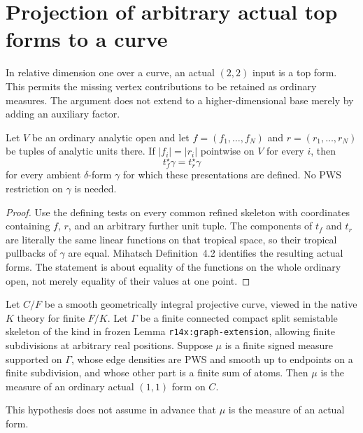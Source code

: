 \section{Projection of arbitrary actual top forms to a curve}
\label{r15tc:section}

In relative dimension one over a curve, an actual $(2,2)$ input
is a top form.  This permits the missing vertex contributions to
be retained as ordinary measures.  The argument does not extend
to a higher-dimensional base merely by adding an auxiliary factor.

\begin{lemma}
\label{r15tc:norm-tuples}
Let $V$ be an ordinary analytic open and let $f=(f_1,\ldots,f_N)$
and $r=(r_1,\ldots,r_N)$ be tuples of analytic units there.
If $|f_i|=|r_i|$ pointwise on $V$ for every $i$, then
\[
                 t_f^\star\gamma=t_r^\star\gamma
\tag{TC15.1}\label{r15tc:equal-norm}
\]
for every ambient $\delta$-form $\gamma$ for which these
presentations are defined.  No PWS restriction on $\gamma$
is needed.
\end{lemma}

\begin{proof}
Use the defining tests on every common refined skeleton with
coordinates containing $f$, $r$, and an arbitrary further unit
tuple.  The components of $t_f$ and $t_r$ are literally the same
linear functions on that tropical space, so their tropical
pullbacks of $\gamma$ are equal.  Mihatsch Definition~4.2
identifies the resulting actual forms.  The statement is about
equality of the functions on the whole ordinary open, not merely
equality of their values at one point.
\end{proof}

\begin{lemma}
\label{r15tc:graph-measure}
Let $C/F$ be a smooth geometrically integral projective curve,
viewed in the native $K$ theory for finite $F/K$.  Let $\Gamma$
be a finite connected compact split semistable skeleton of the
kind in frozen Lemma \texttt{r14x:graph-extension}, allowing
finite subdivisions at arbitrary real positions.  Suppose
$\mu$ is a finite signed measure supported on $\Gamma$, whose
edge densities are PWS and smooth up to endpoints on a finite
subdivision, and whose other part is a finite sum of atoms.
Then $\mu$ is the measure of an ordinary actual
$(1,1)$ form on $C$.

This hypothesis does not assume in advance that $\mu$ is the
measure of an actual form.
\end{lemma}


